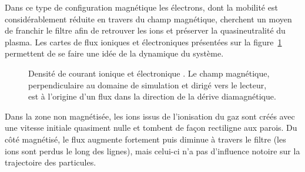 \begin{refsection}
Dans ce type de configuration
magnétique les électrons, dont la mobilité est considérablement réduite en
travers du champ magnétique, cherchent un moyen de franchir le filtre afin de
retrouver les ions et préserver la quasineutralité du plasma. Les cartes de flux
ioniques et électroniques présentées sur la figure~\ref{4-PegasesCarteFlux}
permettent de se faire une idée de la dynamique du système. 

\begin{figure}[!htbp]
  \centering
    \caption{Densité de courant ionique 
    et électronique . Le champ magnétique,
    perpendiculaire au domaine de simulation et dirigé vers le lecteur, est à
    l'origine d'un flux dans la direction de la dérive diamagnétique.}
    \label{4-PegasesCarteFlux}
\end{figure}

Dans la zone non
magnétisée, les ions issus de l'ionisation du gaz sont créés avec une vitesse
initiale quasiment nulle et tombent de façon rectiligne aux parois. Du côté
magnétisé, le flux augmente fortement puis diminue à travers le filtre (les
ions sont perdus le long des lignes), mais celui-ci n'a pas d'influence notoire
sur la trajectoire des particules.


\end{refsection}
